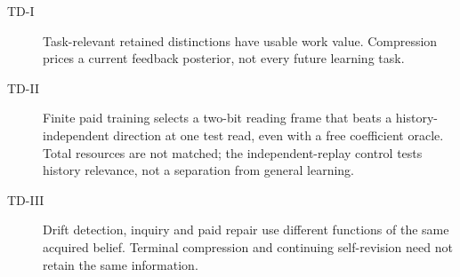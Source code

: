\documentclass[11pt,a4paper]{article}
\begin{document}
\begin{description}
\item[TD-I] Task-relevant retained distinctions have usable work value. Compression prices a current feedback posterior, not every future learning task.
\item[TD-II] Finite paid training selects a two-bit reading frame that beats a history-independent direction at one test read, even with a free coefficient oracle. Total resources are not matched; the independent-replay control tests history relevance, not a separation from general learning.
\item[TD-III] Drift detection, inquiry and paid repair use different functions of the same acquired belief. Terminal compression and continuing self-revision need not retain the same information.
\end{description}
\end{document}
